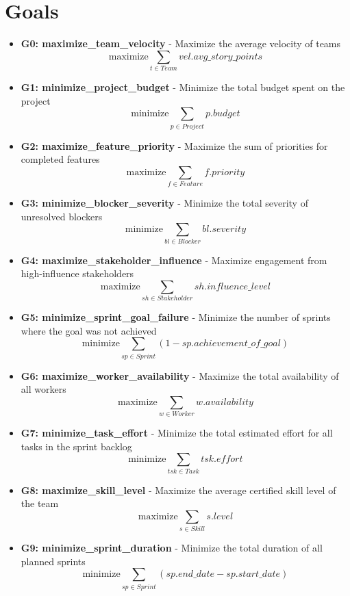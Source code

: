 \documentclass{article}
\begin{document}
\section{Goals}
\begin{itemize}
    \item \textbf{G0: maximize\_team\_velocity} - Maximize the average velocity of teams
        \[ \text{maximize} \sum_{t \in Team} vel.avg\_story\_points \]
    \item \textbf{G1: minimize\_project\_budget} - Minimize the total budget spent on the project
        \[ \text{minimize} \sum_{p \in Project} p.budget \]
    \item \textbf{G2: maximize\_feature\_priority} - Maximize the sum of priorities for completed features
        \[ \text{maximize} \sum_{f \in Feature} f.priority \]
    \item \textbf{G3: minimize\_blocker\_severity} - Minimize the total severity of unresolved blockers
        \[ \text{minimize} \sum_{bl \in Blocker} bl.severity \]
    \item \textbf{G4: maximize\_stakeholder\_influence} - Maximize engagement from high-influence stakeholders
        \[ \text{maximize} \sum_{sh \in Stakeholder} sh.influence\_level \]
    \item \textbf{G5: minimize\_sprint\_goal\_failure} - Minimize the number of sprints where the goal was not achieved
        \[ \text{minimize} \sum_{sp \in Sprint} (1 - sp.achievement\_of\_goal) \]
    \item \textbf{G6: maximize\_worker\_availability} - Maximize the total availability of all workers
        \[ \text{maximize} \sum_{w \in Worker} w.availability \]
    \item \textbf{G7: minimize\_task\_effort} - Minimize the total estimated effort for all tasks in the sprint backlog
        \[ \text{minimize} \sum_{tsk \in Task} tsk.effort \]
    \item \textbf{G8: maximize\_skill\_level} - Maximize the average certified skill level of the team
        \[ \text{maximize} \sum_{s \in Skill} s.level \]
    \item \textbf{G9: minimize\_sprint\_duration} - Minimize the total duration of all planned sprints
        \[ \text{minimize} \sum_{sp \in Sprint} (sp.end\_date - sp.start\_date) \]
\end{itemize}
\end{document}
